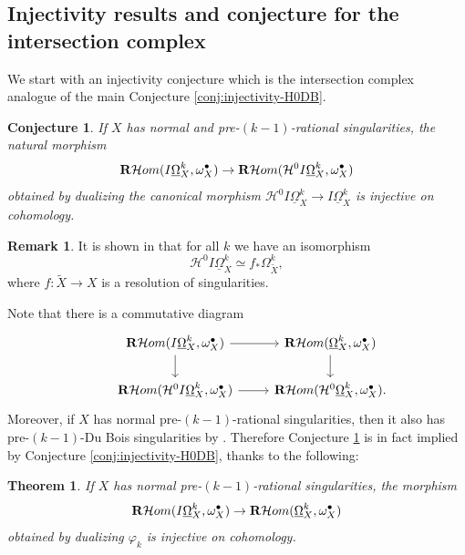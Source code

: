 \documentclass[11pt]{amsart}
\newtheorem{theorem}[equation]{Theorem}
\newtheorem{conjecture}[equation]{Conjecture}
\theoremstyle{definition}
\newtheorem{remark}[equation]{Remark}
\theoremstyle{plain}
\renewcommand{\H}{\mathcal H}
\newcommand{\RHom}{{\bf R} \H om}
\newcommand{\DB}{\underline{\Omega}} %
\begin{document}
\subsection{Injectivity results and conjecture for the intersection complex}\label{scn:injectivity-IC}
We start with an injectivity conjecture which is the intersection complex analogue of the main Conjecture \ref{conj:injectivity-H0DB}.

\begin{conjecture}\label{conj:IC2}
If $X$  has normal and pre-$(k-1)$-rational singularities, the natural morphism
$$\RHom(I\DB_X^k,\omega_X^{\bullet}) \to \RHom(\H^0 I\DB_X^k,\omega_X^{\bullet})$$
obtained by dualizing the canonical morphism $\H^0 I\DB_X^k \to I\DB_X^k$ is injective on cohomology.
\end{conjecture}

\begin{remark}\label{rmk:H0-IC}
It is shown in \cite[Proposition 8.1]{KS-extending} that for all $k$ we have an isomorphism 
$$\H^0 I\DB_X^k \simeq f_* \Omega_{\widetilde X}^k,$$
where $f \colon \widetilde{X} \to X$ is a resolution of singularities.
\end{remark}


Note that there is a commutative diagram 
    \[\begin{tikzcd}
        &\RHom(I\DB_X^k,\omega_X^{\bullet})\ar[d] \ar[r]& \RHom(\DB_X^k,\omega_X^{\bullet}) \ar[d] \\
        &\RHom(\H^0 I\DB_X^k,\omega_X^{\bullet})\ar[r]& \RHom(\H^0 \DB_X^k,\omega_X^{\bullet}).
    \end{tikzcd}\]
Moreover, if $X$ has normal pre-$(k-1)$-rational singularities, then it also has pre-$(k-1)$-Du Bois singularities 
by \cite[Theorem B]{SVV}. Therefore Conjecture \ref{conj:IC2} is in fact implied by Conjecture \ref{conj:injectivity-H0DB}, thanks to the following:

\begin{theorem}\label{thm:IC1}
If $X$ has normal pre-$(k-1)$-rational singularities, the morphism
$$\RHom(I\DB_X^k,\omega_X^{\bullet}) \to \RHom(\DB_X^k,\omega_X^{\bullet})$$
obtained by dualizing $\varphi_k$ is injective on cohomology. 
\end{theorem}
\end{document}
